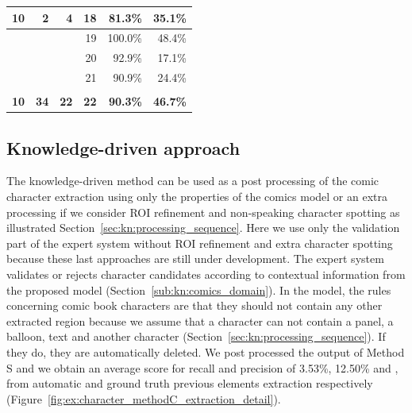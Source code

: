 \begin{table}[h]
\begin{tabular}{|c|l|l|r|r|r|}
\multicolumn{1}{|r|}{10} & \multicolumn{1}{r|}{2} & \multicolumn{1}{r|}{4} & 18 & 81.3\% & 35.1\% \\ \hline
 &   &  & 19 & 100.0\% & 48.4\% \\ \hline
 &   &  & 20 & 92.9\% & 17.1\% \\ \hline
 &   &  & 21 & 90.9\% & 24.4\% \\ \hline
 &  &  &  & &  \\ \hline %
\multicolumn{1}{|r|}{\textbf{10}} & \multicolumn{1}{r|}{\textbf{34}} & \multicolumn{1}{r|}{\textbf{22}} & \multicolumn{1}{r|}{\textbf{22}} & \textbf{90.3\%} & \textbf{46.7\%} \\ \hline
\end{tabular}
\label{tab:ex:character_spotting_detail_result}
\end{table}



\subsection{Knowledge-driven approach} %

The knowledge-driven method can be used as a post processing of the comic character extraction using only the properties of the comics model or an extra processing if we consider ROI refinement and non-speaking character spotting as illustrated Section~\ref{sec:kn:processing_sequence}.
Here we use only the validation part of the expert system without ROI refinement and extra character spotting because these last approaches are still under development.
The expert system validates or rejects character candidates according to contextual information from the proposed model (Section~\ref{sub:kn:comics_domain}).
In the model, the rules concerning comic book characters are that they should not contain any other extracted region because we assume that a character can not contain a panel, a balloon, text and another character (Section~\ref{sec:kn:processing_sequence}). If they do, they are automatically deleted.
We post processed the output of Method S and we obtain an average score for recall and precision of 3.53\%, 12.50\% and ,  from automatic and ground truth previous elements extraction respectively (Figure~\ref{fig:ex:character_methodC_extraction_detail}).

